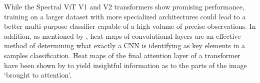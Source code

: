 While the Spectral ViT V1 and V2 transformers show promising performance, 
training on a larger dataset with more specialized architectures could
lead to a better multi-purpose classifier capable of a high volume of precise observations. In addition, as mentioned 
by \textcite{Sepeku2022}, heat maps of convolutional layers are an effective method of 
determining what exactly a CNN is identifying as 
key elements in a samples classification. Heat maps of the final attention layer of a transformer 
have been shown by \textcite{dosovitskiy2020} to yield insightful information as to the parts of the image `brought
to attention'. 
